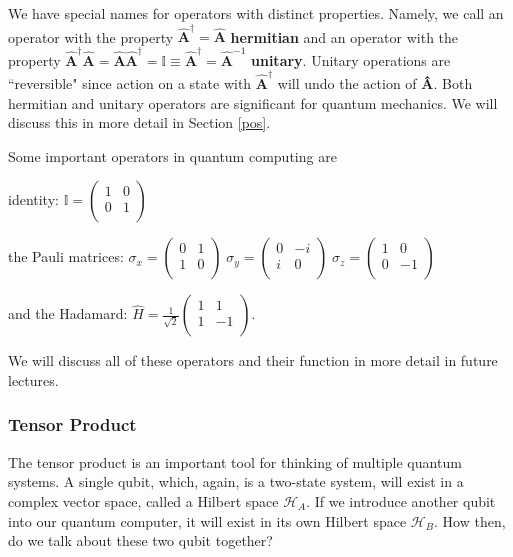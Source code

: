 \documentclass[11pt]{article} %
\begin{document}
We have special names for operators with distinct properties. Namely, we call an operator with the property $\hat{\textbf{A}}^\dagger = \hat{\textbf{A}}$ \textbf{hermitian} and an operator with the property $\hat{\textbf{A}}^\dagger\hat{\textbf{A}} = \hat{\textbf{A}}\hat{\textbf{A}}^\dagger = \mathbb{I} \equiv \hat{\textbf{A}}^\dagger = \hat{\textbf{A}}^{-1}$ \textbf{unitary}. Unitary operations are ``reversible" since action on a state with $\hat{\textbf{A}}^\dagger$ will undo the action of \textbf{\^{A}}. Both hermitian and unitary operators are significant for quantum mechanics. We will discuss this in more detail in Section \ref{pos}.

Some important operators in quantum computing are 

\noindent identity:
$\mathbb{I} = 
    \begin{pmatrix}
        1 & 0 \\
        0 & 1 \\
    \end{pmatrix}\nonumber$
    
\noindent the Pauli matrices: 
$\sigma_x = 
    \begin{pmatrix}
        0 & 1 \\
        1 & 0 \\
    \end{pmatrix}\;
    \sigma_y = 
    \begin{pmatrix}
        0 & -i \\
        i & 0 \\
    \end{pmatrix}\;
    \sigma_z = 
    \begin{pmatrix}
        1 & 0 \\
        0 & -1 \\
    \end{pmatrix}$
    
\noindent and the Hadamard:
$\hat{H} = \frac{1}{\sqrt{2}}
    \begin{pmatrix}
        1 & 1 \\
        1 & -1 \\
    \end{pmatrix}$.
    
\noindent We will discuss all of these operators and their function in more detail in future lectures.
    
\subsubsection{Tensor Product}
The tensor product is an important tool for thinking of multiple quantum systems. A single qubit, which, again, is a two-state system, will exist in a complex vector space, called a Hilbert space $\mathcal{H}_A$. If we introduce another qubit into our quantum computer, it will exist in its own Hilbert space $\mathcal{H}_B$. How then, do we talk about these two qubit together?
\end{document}
